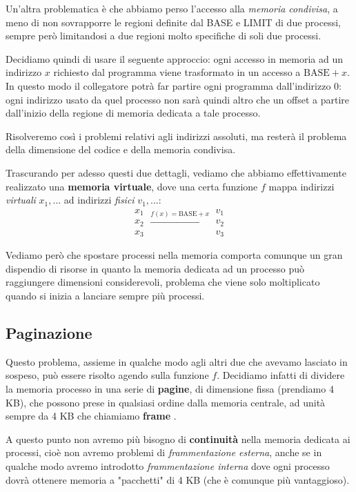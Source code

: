 \documentclass[a4paper,11pt]{article}
\begin{document}
Un'altra problematica è che abbiamo perso l'accesso alla \textit{memoria condivisa}, a meno di non sovrapporre le regioni definite dal BASE e LIMIT di due processi, sempre però limitandosi a due regioni molto specifiche di soli due processi.

Decidiamo quindi di usare il seguente approccio: ogni accesso in memoria ad un indirizzo $x$ richiesto dal programma viene trasformato in un accesso a $\text{BASE} + x$.
In questo modo il collegatore potrà far partire ogni programma dall'indirizzo 0: ogni indirizzo usato da quel processo non sarà quindi altro che un offset a partire dall'inizio della regione di memoria dedicata a tale processo.

Risolveremo così i problemi relativi agli indirizzi assoluti, ma resterà il problema della dimensione del codice e della memoria condivisa.

Trascurando per adesso questi due dettagli, vediamo che abbiamo effettivamente realizzato una \textbf{memoria virtuale}, dove una certa funzione $f$ mappa indirizzi \textit{virtuali} $x_1, ...$ ad indirizzi \textit{fisici} $v_1, ...$:
$$
\begin{array}{c}
	x_1 \\ x_2 \\ x_3
\end{array}
\xrightarrow{f(x) = \text{BASE} + x}
\begin{array}{c}
	v_1 \\ v_2 \\ v_3
\end{array}
$$

Vediamo però che spostare processi nella memoria comporta comunque un gran dispendio di risorse in quanto la memoria dedicata ad un processo può raggiungere dimensioni considerevoli, problema che viene solo moltiplicato quando si inizia a lanciare sempre più processi.

\subsection{Paginazione}
Questo problema, assieme in qualche modo agli altri due che avevamo lasciato in sospeso, può essere risolto agendo sulla funzione $f$.
Decidiamo infatti di dividere la memoria processo in una serie di \textbf{pagine}, di dimensione fissa (prendiamo 4 KB), che possono prese in qualsiasi ordine dalla memoria centrale, ad unità sempre da 4 KB che chiamiamo \textbf{frame
}.

A questo punto non avremo più bisogno di \textbf{continuità} nella memoria dedicata ai processi, cioè non avremo problemi di \textit{frammentazione esterna}, anche se in qualche modo avremo introdotto \textit{frammentazione interna} dove ogni processo dovrà ottenere memoria a "pacchetti" di 4 KB (che è comunque più vantaggioso).
\end{document}
